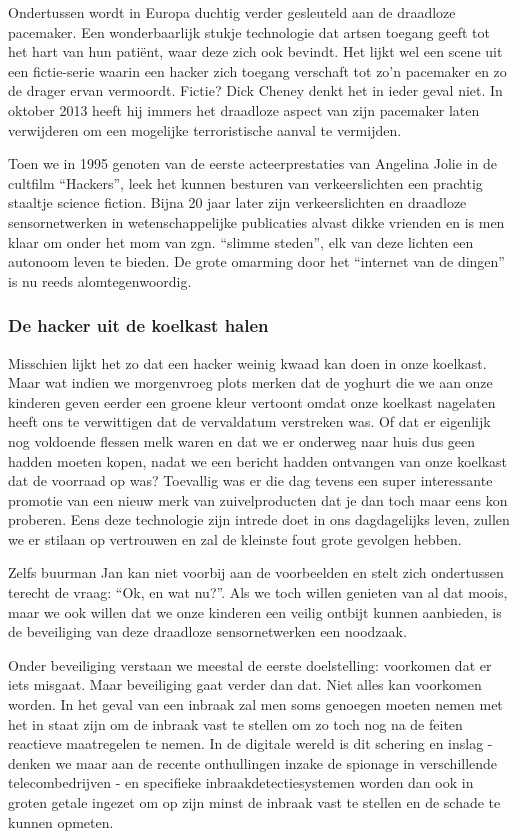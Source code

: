 \documentclass[DIV=calc,paper=a4,fontsize=11pt,twocolumn,draft]{scrartcl}
\newcommand{\heading}[1]{
\subsubsection*{#1}
\vspace{-2mm}
}
\begin{document}
Ondertussen wordt in Europa duchtig verder gesleuteld aan de draadloze
pacemaker. Een wonderbaarlijk stukje technologie dat artsen toegang geeft tot
het hart van hun pati\"ent, waar deze zich ook bevindt. Het lijkt wel een scene
uit een fictie-serie waarin een hacker zich toegang verschaft tot zo'n
pacemaker en zo de drager ervan vermoordt. Fictie? Dick Cheney denkt het in
ieder geval niet. In oktober 2013 heeft hij immers het draadloze aspect van
zijn pacemaker laten verwijderen om een mogelijke terroristische aanval te
vermijden.

Toen we in 1995 genoten van de eerste acteerprestaties van Angelina Jolie in de
cultfilm ``Hackers'', leek het kunnen besturen van verkeerslichten een prachtig
staaltje science fiction. Bijna 20 jaar later zijn verkeerslichten en draadloze
sensornetwerken in wetenschappelijke publicaties alvast dikke vrienden en is
men klaar om onder het mom van zgn. ``slimme steden'', elk van deze lichten een
autonoom leven te bieden. De grote omarming door het ``internet van de dingen''
is nu reeds alomtegenwoordig.

\heading{De hacker uit de koelkast halen}

Misschien lijkt het zo dat een hacker weinig kwaad kan doen in onze koelkast.
Maar wat indien we morgenvroeg plots merken dat de yoghurt die we aan onze
kinderen geven eerder een groene kleur vertoont omdat onze koelkast nagelaten
heeft ons te verwittigen dat de vervaldatum verstreken was. Of dat er eigenlijk
nog voldoende flessen melk waren en dat we er onderweg naar huis dus geen
hadden moeten kopen, nadat we een bericht hadden ontvangen van onze koelkast
dat de voorraad op was? Toevallig was er die dag tevens een super interessante
promotie van een nieuw merk van zuivelproducten dat je dan toch maar eens kon
proberen. Eens deze technologie zijn intrede doet in ons dagdagelijks leven,
zullen we er stilaan op vertrouwen en zal de kleinste fout grote gevolgen
hebben.

Zelfs buurman Jan kan niet voorbij aan de voorbeelden en stelt zich ondertussen
terecht de vraag: ``Ok, en wat nu?''. Als we toch willen genieten van al dat
moois, maar we ook willen dat we onze kinderen een veilig ontbijt kunnen
aanbieden, is de beveiliging van deze draadloze sensornetwerken een noodzaak.

Onder beveiliging verstaan we meestal de eerste doelstelling: voorkomen dat er
iets misgaat. Maar beveiliging gaat verder dan dat. Niet alles kan voorkomen
worden. In het geval van een inbraak zal men soms genoegen moeten nemen met het
in staat zijn om de inbraak vast te stellen om zo toch nog na de feiten
reactieve maatregelen te nemen. In de digitale wereld is dit schering en inslag
- denken we maar aan de recente onthullingen inzake de spionage in
verschillende telecombedrijven - en specifieke inbraakdetectiesystemen worden
dan ook in groten getale ingezet om op zijn minst de inbraak vast te stellen en
de schade te kunnen opmeten.
\end{document}
